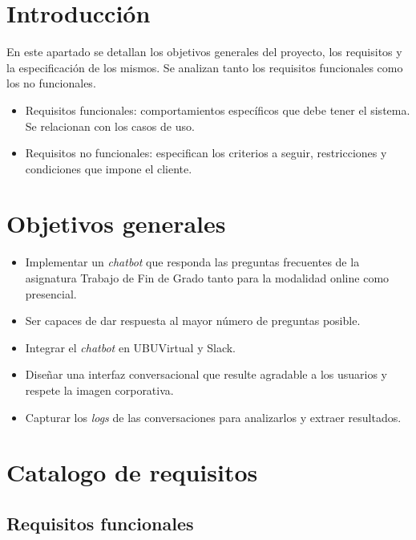 
\section{Introducción}

En este apartado se detallan los objetivos generales del proyecto, los requisitos y la especificación de los mismos.  
Se analizan tanto los requisitos funcionales como los no funcionales. 
\begin{itemize}
	\tightlist
	\item
	Requisitos funcionales: comportamientos específicos que debe tener el sistema. Se relacionan con los casos de uso.
	\item
	Requisitos no funcionales: especifican los criterios a seguir, restricciones y condiciones que impone el cliente.

\end{itemize}

\section{Objetivos generales}


\begin{itemize}
	\tightlist
	\item
	Implementar un \textit{chatbot} que responda las preguntas frecuentes de la asignatura Trabajo de Fin de Grado tanto para la modalidad online como presencial.
	\item
	Ser capaces de dar respuesta al mayor número de preguntas posible.
	\item
	Integrar el \textit{chatbot} en UBUVirtual y Slack.
	\item
	Diseñar una interfaz conversacional que resulte agradable a los usuarios y respete la imagen corporativa.
	\item
	Capturar los \textit{logs} de las conversaciones para analizarlos y extraer resultados. 
\end{itemize}
\newpage

\section{Catalogo de requisitos}


\subsection{Requisitos funcionales}\label{requisitosFuncionales}


